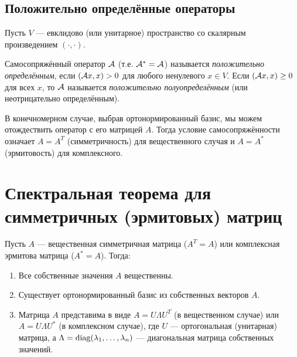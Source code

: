\documentclass[10pt]{article}
\begin{document}
\subsection{Положительно определённые операторы}

Пусть $V$ — евклидово (или унитарное) пространство со скалярным произведением $(\cdot, \cdot)$.

\begin{definition}
    Самосопряжённый оператор $\mathcal{A}$ (т.е. $\mathcal{A}^* = \mathcal{A}$) называется \textit{положительно определённым}, если $(\mathcal{A} x, x) > 0$ для любого ненулевого $x \in V$. Если $(\mathcal{A} x, x) \ge 0$ для всех $x$, то $\mathcal{A}$ называется \textit{положительно полуопределённым} (или неотрицательно определённым).
\end{definition}

\begin{remark}
    В конечномерном случае, выбрав ортонормированный базис, мы можем отождествить оператор с его матрицей $A$. Тогда условие самосопряжённости означает $A = A^T$ (симметричность) для вещественного случая и $A = A^*$ (эрмитовость) для комплексного.
\end{remark}


\section{Спектральная теорема для симметричных (эрмитовых) матриц}

\begin{theorem}
    Пусть $A$ — вещественная симметричная матрица ($A^T = A$) или комплексная эрмитова матрица ($A^* = A$). Тогда:
    \begin{enumerate}
        \item Все собственные значения $A$ вещественны.
        \item Существует ортонормированный базис из собственных векторов $A$.
        \item Матрица $A$ представима в виде $A = U \Lambda U^T$ (в вещественном случае) или $A = U \Lambda U^*$ (в комплексном случае), где $U$ — ортогональная (унитарная) матрица, а $\Lambda = \operatorname{diag}(\lambda_1,\dots,\lambda_n)$ — диагональная матрица собственных значений.
    \end{enumerate}
\end{theorem}
\end{document}
